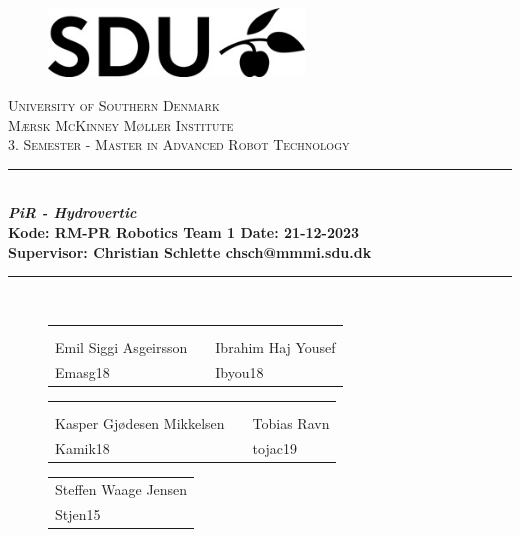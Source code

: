 \begin{titlepage}

\begin{center}

\begin{figure}[H]
    \centering
    \includegraphics[width=6.8cm]{Tables and Images/MainDocument/small_sdu.png}
\end{figure}

\textsc{\Large University of Southern Denmark\\ Mærsk McKinney Møller Institute} \\[.5cm]

\textsc{\large 3. Semester - Master in Advanced Robot Technology}\\
\rule{\linewidth}{0.5mm}\\
{ \LARGE \bfseries \textit{PiR - Hydrovertic}  \\}
\textbf{Kode: RM-PR \hspace*{2 cm} Robotics Team 1 \hspace*{2 cm}
    Date: 21-12-2023  } \\
\textbf{Supervisor: Christian Schlette chsch@mmmi.sdu.dk}
\rule{\linewidth}{0.5mm}\\
    \vspace{3cm}

    \begin{figure}[H]
        \centering
        \begin{tabular}{P{5cm} p{1cm} P{5cm}}
            & & \\   \\
            Emil Siggi Asgeirsson & &  Ibrahim Haj Yousef \\
            Emasg18 & & Ibyou18 
        \end{tabular}
    \end{figure}

    \begin{figure}[H]
        \centering
        \begin{tabular}{P{5cm} p{1cm} P{5cm}}
            & & \\   \\
            Kasper Gjødesen Mikkelsen& &  Tobias Ravn \\
            Kamik18 & & tojac19 
        \end{tabular}
    \end{figure}

    
    \begin{figure}[H]
        \centering
        \begin{tabular}{P{5cm}}
             \\
            Steffen Waage Jensen\\
            Stjen15
        \end{tabular}
    \end{figure}
\end{center}
\end{titlepage}